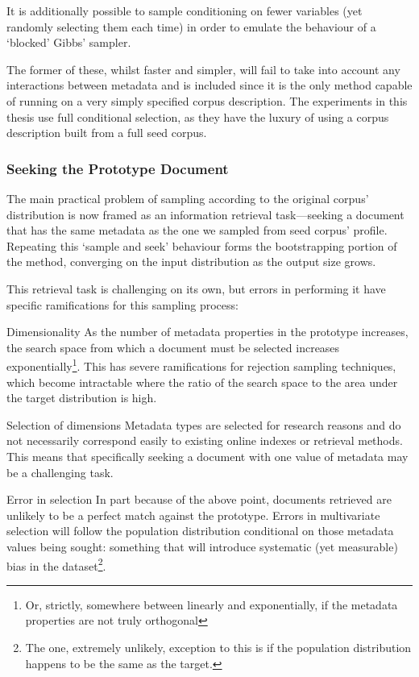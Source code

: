 
It is additionally possible to sample conditioning on fewer variables (yet randomly selecting them each time) in order to emulate the behaviour of a `blocked' Gibbs' sampler.

The former of these, whilst faster and simpler, will fail to take into account any interactions between metadata and is included since it is the only method capable of running on a very simply specified corpus description.  The experiments in this thesis use full conditional selection, as they have the luxury of using a corpus description built from a full seed corpus.


\subsubsection{Seeking the Prototype Document}
\label{sec:rebuilding:design:seekprototype}
The main practical problem of sampling according to the original corpus' distribution is now framed as an information retrieval task---seeking a document that has the same metadata as the one we sampled from seed corpus' profile.  Repeating this `sample and seek' behaviour forms the bootstrapping portion of the method, converging on the input distribution as the output size grows.

This retrieval task is challenging on its own, but errors in performing it have specific ramifications for this sampling process:

\begin{itemizeTitle}
    \item[Dimensionality]As the number of metadata properties in the prototype increases, the search space from which a document must be selected increases exponentially\footnote{Or, strictly, somewhere between linearly and exponentially, if the metadata properties are not truly orthogonal}.  This has severe ramifications for rejection sampling techniques, which become intractable where the ratio of the search space to the area under the target distribution is high.

    \item[Selection of dimensions]Metadata types are selected for research reasons and do not necessarily correspond easily to existing online indexes or retrieval methods.  This means that specifically seeking a document with one value of metadata may be a challenging task.

    \item[Error in selection]In part because of the above point, documents retrieved are unlikely to be a perfect match against the prototype.  Errors in multivariate selection will follow the population distribution conditional on those metadata values being sought: something that will introduce systematic (yet measurable) bias in the dataset\footnote{The one, extremely unlikely, exception to this is if the population distribution happens to be the same as the target.}.
\end{itemizeTitle}

